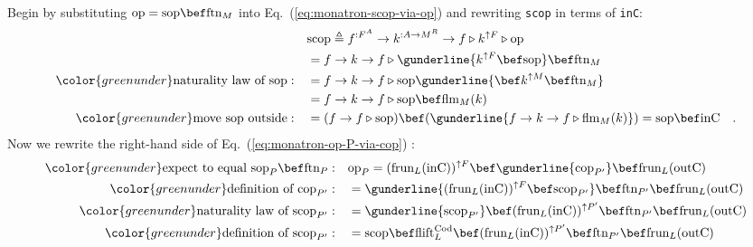 Begin by substituting $\text{op}=\text{sop}\bef\text{ftn}_{M}$ into
Eq.~(\ref{eq:monatron-scop-via-op}) and rewriting \lstinline!scop!
in terms of \lstinline!inC!:
\begin{align*}
 & \text{scop}\triangleq f^{:F^{A}}\rightarrow k^{:A\rightarrow M^{R}}\rightarrow f\triangleright k^{\uparrow F}\triangleright\text{op}\\
 & =f\rightarrow k\rightarrow f\triangleright\gunderline{k^{\uparrow F}\bef\text{sop}}\bef\text{ftn}_{M}\\
{\color{greenunder}\text{naturality law of }\text{sop}:}\quad & =f\rightarrow k\rightarrow f\triangleright\text{sop}\gunderline{\bef k^{\uparrow M}\bef\text{ftn}_{M}}\\
 & =f\rightarrow k\rightarrow f\triangleright\text{sop}\bef\text{flm}_{M}(k)\\
{\color{greenunder}\text{move }\text{sop}\text{ outside}:}\quad & =(f\rightarrow f\triangleright\text{sop})\bef(\gunderline{f\rightarrow k\rightarrow f\triangleright\text{flm}_{M}(k)})=\text{sop}\bef\text{inC}\quad.
\end{align*}
Now we rewrite the right-hand side of Eq.~(\ref{eq:monatron-op-P-via-cop})
:
\begin{align*}
{\color{greenunder}\text{expect to equal }\text{sop}_{P}\bef\text{ftn}_{P}:}\quad & \text{op}_{P}=(\text{frun}_{L}(\text{inC}))^{\uparrow F}\bef\gunderline{\text{cop}_{P^{\prime}}}\bef\text{frun}_{L}(\text{outC})\\
{\color{greenunder}\text{definition of }\text{cop}_{P^{\prime}}:}\quad & =\gunderline{(\text{frun}_{L}(\text{inC}))^{\uparrow F}\bef\text{scop}_{P^{\prime}}}\bef\text{ftn}_{P^{\prime}}\bef\text{frun}_{L}(\text{outC})\\
{\color{greenunder}\text{naturality law of }\text{scop}_{P^{\prime}}:}\quad & =\gunderline{\text{scop}_{P^{\prime}}}\bef(\text{frun}_{L}(\text{inC}))^{\uparrow P^{\prime}}\bef\text{ftn}_{P^{\prime}}\bef\text{frun}_{L}(\text{outC})\\
{\color{greenunder}\text{definition of }\text{scop}_{P^{\prime}}:}\quad & =\text{scop}\bef\text{flift}_{L}^{\text{Cod}}\bef(\text{frun}_{L}(\text{inC}))^{\uparrow P^{\prime}}\bef\text{ftn}_{P^{\prime}}\bef\text{frun}_{L}(\text{outC})
\end{align*}
